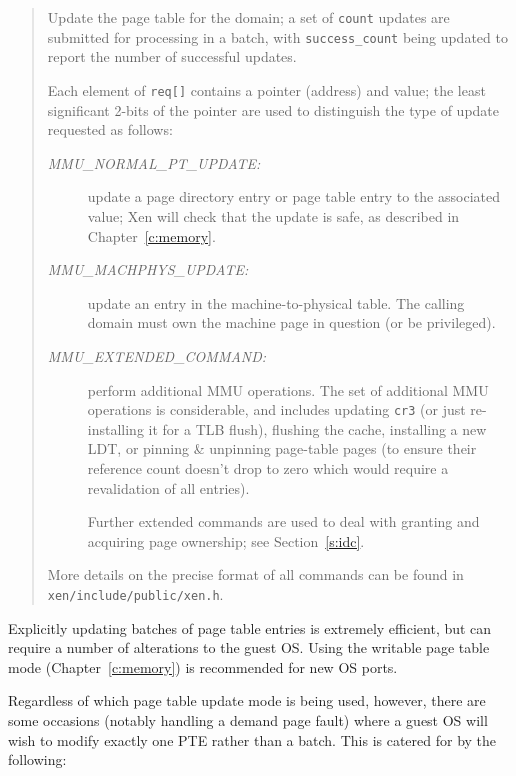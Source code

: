 \documentclass[11pt,twoside,final,openright]{report}
\begin{document}
\begin{quote} 

Update the page table for the domain; a set of {\tt count} updates are
submitted for processing in a batch, with {\tt success\_count} being 
updated to report the number of successful updates.  

Each element of {\tt req[]} contains a pointer (address) and value; 
the least significant 2-bits of the pointer are used to distinguish 
the type of update requested as follows:
\begin{description} 

\item[\it MMU\_NORMAL\_PT\_UPDATE:] update a page directory entry or
page table entry to the associated value; Xen will check that the
update is safe, as described in Chapter~\ref{c:memory}.

\item[\it MMU\_MACHPHYS\_UPDATE:] update an entry in the
  machine-to-physical table. The calling domain must own the machine
  page in question (or be privileged).

\item[\it MMU\_EXTENDED\_COMMAND:] perform additional MMU operations.
The set of additional MMU operations is considerable, and includes
updating {\tt cr3} (or just re-installing it for a TLB flush),
flushing the cache, installing a new LDT, or pinning \& unpinning
page-table pages (to ensure their reference count doesn't drop to zero
which would require a revalidation of all entries).

Further extended commands are used to deal with granting and 
acquiring page ownership; see Section~\ref{s:idc}. 


\end{description}

More details on the precise format of all commands can be 
found in {\tt xen/include/public/xen.h}. 


\end{quote}

Explicitly updating batches of page table entries is extremely
efficient, but can require a number of alterations to the guest
OS. Using the writable page table mode (Chapter~\ref{c:memory}) is
recommended for new OS ports.

Regardless of which page table update mode is being used, however,
there are some occasions (notably handling a demand page fault) where
a guest OS will wish to modify exactly one PTE rather than a
batch. This is catered for by the following:
\end{document}
